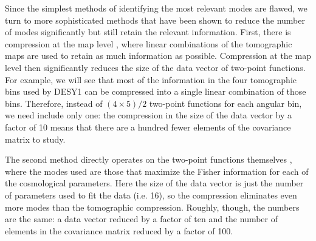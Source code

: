 \documentclass[twocolumn]{\docclass}
\def\bea{\begin{eqnarray}}
\def\eea{\end{eqnarray}}
\begin{document}
	Since the simplest methods of identifying the most relevant modes are flawed, we turn to more sophisticated methods \citep{Tegmark:1997maa, Joachimi:2017mnr,Gualdi:2018gmj} that have been shown to reduce the number of modes significantly but still retain the relevant information. First, there is compression at the map level \citep{Alonso:2017hhj}, where linear combinations of the tomographic maps are used to retain as much information as possible. Compression at the map level then significantly reduces the size of the data vector of two-point functions. For example, we will see that most of the information in the four tomographic bins used by DESY1 can be compressed into a single linear combination of those bins. Therefore, instead of $(4\times5)/2$ two-point functions for each angular bin, we need include only one: the compression in the size of the data vector by a factor of 10 means that there are a hundred fewer elements of the covariance matrix to study.
	
	The second method directly operates on the two-point functions themselves \citep{Zablocki:2015zcm}, where the modes used are those that maximize the Fisher information for each of the cosmological parameters. Here the size of the data vector is just the number of parameters used to fit the data (i.e. 16), so the compression eliminates even more modes than the tomographic compression. Roughly, though, the numbers are the same: a data vector reduced by a factor of ten and the number of elements in the covariance matrix reduced by a factor of 100.
	
	
\end{document}
